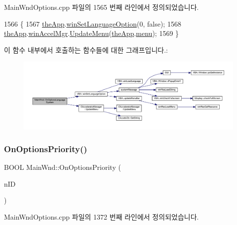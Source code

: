 Main\+Wnd\+Options.\+cpp 파일의 1565 번째 라인에서 정의되었습니다.


\begin{DoxyCode}
1566 \{
1567   \mbox{\hyperlink{_v_b_a_8cpp_a8095a9d06b37a7efe3723f3218ad8fb3}{theApp}}.\mbox{\hyperlink{class_v_b_a_ae872998a3ecf3ec0d504378744f441e6}{winSetLanguageOption}}(0, \textcolor{keyword}{false});
1568   \mbox{\hyperlink{_v_b_a_8cpp_a8095a9d06b37a7efe3723f3218ad8fb3}{theApp}}.\mbox{\hyperlink{class_v_b_a_ad7ebce057dbde0ca88cee75e84721a89}{winAccelMgr}}.\mbox{\hyperlink{class_c_accelerator_manager_ac7411d20f413ea0ec3bd65705b564adf}{UpdateMenu}}(\mbox{\hyperlink{_v_b_a_8cpp_a8095a9d06b37a7efe3723f3218ad8fb3}{theApp}}.\mbox{\hyperlink{class_v_b_a_acf9d855b5b959a2df9c6cb21b888366e}{menu}});
1569 \}
\end{DoxyCode}
이 함수 내부에서 호출하는 함수들에 대한 그래프입니다.\+:
\nopagebreak
\begin{figure}[H]
\begin{center}
\leavevmode
\includegraphics[width=350pt]{class_main_wnd_a9e8eaf3488f32697f695789cb89a7dce_cgraph}
\end{center}
\end{figure}
\mbox{\label{class_main_wnd_a98477c70a1ecbeacd3972419972d713e}} 
\subsubsection{\texorpdfstring{On\+Options\+Priority()}{OnOptionsPriority()}}
{\footnotesize\ttfamily B\+O\+OL Main\+Wnd\+::\+On\+Options\+Priority (\begin{DoxyParamCaption}\item[{U\+I\+NT}]{n\+ID }\end{DoxyParamCaption})}



Main\+Wnd\+Options.\+cpp 파일의 1372 번째 라인에서 정의되었습니다.


